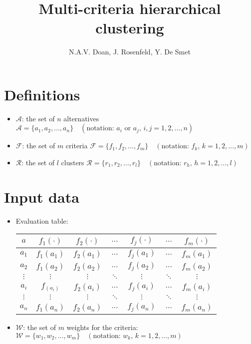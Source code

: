 \documentclass[a4paper]{article}
\title{Multi-criteria hierarchical clustering}
\author{N.A.V. Doan, J. Rosenfeld, Y. De Smet}
\date{}
\begin{document}
    \maketitle
    \section{Definitions}
    \begin{itemize}
        \item $\mathcal{A}$: the set of $n$ alternatives $\mathcal{A} = \{a_1, a_2, \dots, a_n\} \quad (\text{notation: } a_i \text{ or } a_j,\, i,j = 1, 2, \dots, n)$
        \item $\mathcal{F}$: the set of $m$ criteria $\mathcal{F} = \{f_1, f_2, \dots, f_m\} \quad (\text{notation: } f_k,\, k = 1, 2, \dots, m)$
        \item $\mathcal{R}$: the set of $l$ clusters $\mathcal{R} = \{r_1, r_2, \dots, r_l\} \quad (\text{notation: } r_h,\, h = 1, 2, \dots, l)$
    \end{itemize}
    \section{Input data}
    \begin{itemize}
        \item Evaluation table: \begin{tabular}{c|cccccc}
            $a$ & $f_1(\cdot)$ & $f_2(\cdot)$ & $\dots$ & $f_j(\cdot)$ & $\dots$ & $f_m(\cdot)$\\
            \hline
            $a_1$ & $f_1(a_1)$ & $f_2(a_1)$ & $\dots$ & $f_j(a_1)$ & $\dots$ & $f_m(a_1)$\\
            $a_2$ & $f_1(a_2)$ & $f_2(a_2)$ & $\dots$ & $f_j(a_2)$ & $\dots$ & $f_m(a_2)$\\
            $\vdots$ & $\vdots$ & $\vdots$ & $\ddots$ & $\vdots$ & $\ddots$ & $\vdots$\\
            $a_i$ & $f_(a_i)$ & $f_2(a_i)$ & $\dots$ & $f_j(a_i)$ & $\dots$ & $f_m(a_i)$\\
            $\vdots$ & $\vdots$ & $\vdots$ & $\ddots$ & $\vdots$ & $\ddots$ & $\vdots$\\
            $a_n$ & $f_1(a_n)$ & $f_2(a_n)$ & $\dots$ & $f_j(a_n)$ & $\dots$ & $f_m(a_n)$\\
        \end{tabular}
        \item $\mathcal{W}$: the set of $m$ weights for the criteria: $\mathcal{W} = \{w_1, w_2, \dots, w_m\} \quad (\text{notation: } w_k,\, k = 1, 2, \dots, m)$
    \end{itemize}
\end{document}
